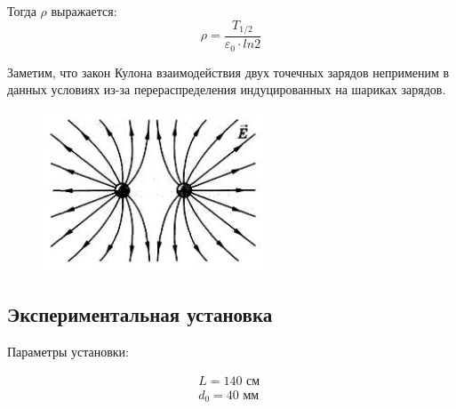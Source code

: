 \documentclass[a4paper, 12pt]{article}
\begin{document}
Тогда $\rho$ выражается:
\begin{equation}
\rho = \frac{T_{1/2}}{\varepsilon_0 \cdot ln 2}
\end{equation}

Заметим, что закон Кулона взаимодействия двух точечных зарядов неприменим в данных условиях из-за перераспределения индуцированных на шариках зарядов.

\begin {figure}[H]
\begin{center}
\includegraphics[width=0.6\textwidth]{7}
\end{center}
\end {figure}

\subsection*{Экспериментальная установка}

Параметры установки:

\begin{equation}
\begin{aligned}
L=140 \text{ см } \\
d_0=40 \text{ мм}
\end{aligned}
\end{equation}
\end{document}
